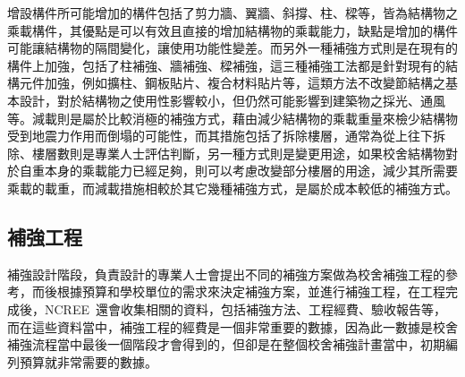 增設構件所可能增加的構件包括了剪力牆、翼牆、斜撐、柱、樑等，皆為結構物之乘載構件，其優點是可以有效且直接的增加結構物的乘載能力，缺點是增加的構件可能讓結構物的隔間變化，讓使用功能性變差。而另外一種補強方式則是在現有的構件上加強，包括了柱補強、牆補強、樑補強，這三種補強工法都是針對現有的結構元件加強，例如擴柱、鋼板貼片、複合材料貼片等，這類方法不改變節結構之基本設計，對於結構物之使用性影響較小，但仍然可能影響到建築物之採光、通風等。減載則是屬於比較消極的補強方式，藉由減少結構物的乘載重量來檢少結構物受到地震力作用而倒塌的可能性，而其措施包括了拆除樓層，通常為從上往下拆除、樓層數則是專業人士評估判斷，另一種方式則是變更用途，如果校舍結構物對於自重本身的乘載能力已經足夠，則可以考慮改變部分樓層的用途，減少其所需要乘載的載重，而減載措施相較於其它幾種補強方式，是屬於成本較低的補強方式。


\subsection{補強工程}

補強設計階段，負責設計的專業人士會提出不同的補強方案做為校舍補強工程的參考，而後根據預算和學校單位的需求來決定補強方案，並進行補強工程，在工程完成後，NCREE~還會收集相關的資料，包括補強方法、工程經費、驗收報告等，而在這些資料當中，補強工程的經費是一個非常重要的數據，因為此一數據是校舍補強流程當中最後一個階段才會得到的，但卻是在整個校舍補強計畫當中，初期編列預算就非常需要的數據。



